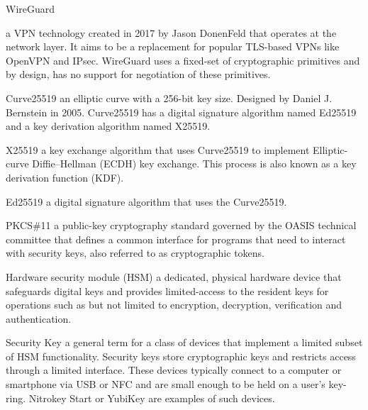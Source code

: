 \documentclass [11pt, proquest] {uwthesis}[2020/02/24]
\begin{document}
\begin{glossary}

\item[WireGuard]

a VPN technology created in 2017 by Jason DonenFeld that operates at the network layer. It aims to be a replacement for popular TLS-based VPNs like OpenVPN and IPsec. WireGuard uses a fixed-set of cryptographic primitives and by design, has no support for negotiation of these primitives. 

\item[Curve25519]
an elliptic curve with a 256-bit key size. Designed by Daniel J. Bernstein in 2005\cite{noauthor_curve25519_nodate}. Curve25519 has a digital signature algorithm named Ed25519 and a key derivation algorithm named X25519.

\item[X25519]
a key exchange algorithm that uses Curve25519 to implement Elliptic-curve Diffie–Hellman (ECDH) key exchange. This process is also known as a key derivation function (KDF).

\item[Ed25519] a digital signature algorithm that uses the Curve25519.

\item[PKCS\#11] a public-key cryptography standard governed by the OASIS technical committee\cite{noauthor_cryptsoft_nodate} that defines a common interface for programs that need to interact with security keys, also referred to as cryptographic tokens.

\item[Hardware security module]
(HSM) a dedicated, physical hardware device that safeguards digital keys and provides limited-access to the resident keys for operations such as but not limited to encryption, decryption, verification and authentication. 

\item[Security Key]
a general term for a class of devices that implement a limited subset of HSM functionality. Security keys store cryptographic keys and restricts access through a limited interface. These devices typically connect to a computer or smartphone via USB or NFC and are small enough to be held on a user's key-ring.
Nitrokey Start\cite{noauthor_nitrokey_nodate} or YubiKey\cite{noauthor_discover_nodate}\cite{noauthor_u2f_nodate-1} are examples of such devices.


\end{glossary}

\textpages
\end{document}
